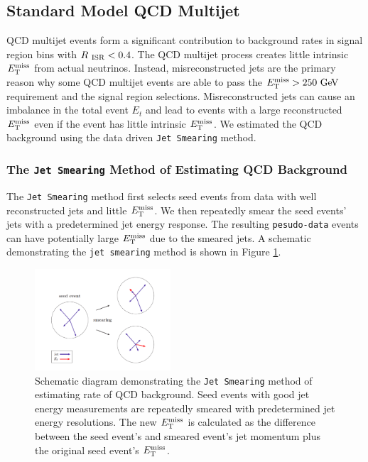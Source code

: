 \subsection{Standard Model QCD Multijet}
\label{sec:Bkg:QCD}

\indent  QCD multijet events form a significant contribution to background rates in signal region bins with $R_{~\mathrm{ISR}} < 0.4$.  The QCD multijet process creates little intrinsic $E_{\mathrm{T}}^{\mathrm{miss}}$ from actual neutrinos. Instead, misreconstructed jets are the primary reason why some QCD multijet events are able to pass the $\met > 250 \gev$ requirement and the signal region selections.  Misreconstructed jets can cause an imbalance in the total event $E_t$ and lead to events with a large reconstructed $E_{\mathrm{T}}^{\mathrm{miss}}$ even if the event has little intrinsic $E_{\mathrm{T}}^{\mathrm{miss}}$.  We estimated the QCD background using the data driven {\tt Jet Smearing} method.   \\

\subsubsection{The {\tt Jet Smearing} Method of Estimating QCD Background}

\indent The {\tt Jet Smearing} method first selects seed events from data with well reconstructed jets and little $E_{\mathrm{T}}^{\mathrm{miss}}$.  We then repeatedly smear the seed events' jets with a predetermined jet energy response.  The resulting {\tt pesudo-data} events can have potentially large $E_{\mathrm{T}}^{\mathrm{miss}}$ due to the smeared jets.  A schematic demonstrating the {\tt jet smearing} method is shown in Figure \ref{fig:jetsmearing}.\\

\begin{figure}[h!]
\begin{center}
\includegraphics[width=0.45\textwidth]{figures/QCDJetSmearing/jet_smearing.pdf}
\end{center}
\caption[Schematic diagram demonstrating the {\tt Jet Smearing} method of estimating QCD background]{Schematic diagram demonstrating the {\tt Jet Smearing} method of estimating rate of QCD background.  Seed events with good jet energy measurements are repeatedly smeared with predetermined jet energy resolutions.  The new $E_{\mathrm{T}}^{\mathrm{miss}}$ is calculated as the difference between the seed event's and smeared event's jet momentum plus the original seed event's $E_{\mathrm{T}}^{\mathrm{miss}}$.\cite{JetSmearing} }
\label{fig:jetsmearing}
\end{figure}

